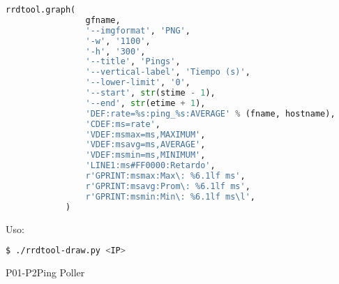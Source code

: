 \begin{itemize}
\begin{lstlisting}[language=python]
			rrdtool.graph(
				gfname,
				'--imgformat', 'PNG',
				'-w', '1100',
				'-h', '300',
				'--title', 'Pings',
				'--vertical-label', 'Tiempo (s)',
				'--lower-limit', '0',
				'--start', str(stime - 1),
				'--end', str(etime + 1),
				'DEF:rate=%s:ping_%s:AVERAGE' % (fname, hostname),
				'CDEF:ms=rate',
				'VDEF:msmax=ms,MAXIMUM',
				'VDEF:msavg=ms,AVERAGE',
				'VDEF:msmin=ms,MINIMUM',
				'LINE1:ms#FF0000:Retardo',
				r'GPRINT:msmax:Max\: %6.1lf ms',
				r'GPRINT:msavg:Prom\: %6.1lf ms',
				r'GPRINT:msmin:Min\: %6.1lf ms\l',
			)
		\end{lstlisting}
		Uso:\\
		\begin{lstlisting}[language=bash]
			$ ./rrdtool-draw.py <IP>
		\end{lstlisting}
\end{itemize}

\begin{prueba}{P01-P2}{Ping Poller}
\end{prueba}
